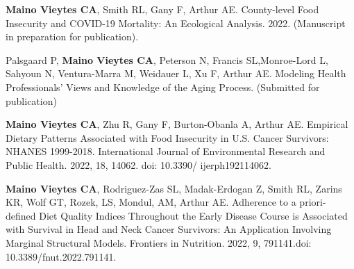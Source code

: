 




\begin{cvskills}

  \cvskill
    {} %
    {\textbf{Maino Vieytes CA}, Smith RL, Gany F, Arthur AE. County-level Food Insecurity and COVID-19 Mortality: An Ecological Analysis. 2022. (Manuscript in preparation for publication).} %


  
   \cvskill
    {} %
    {Palsgaard P, \textbf{Maino Vieytes CA}, Peterson N, Francis SL,Monroe-Lord L, Sahyoun N, Ventura-Marra M, Weidauer L, Xu F, Arthur AE. Modeling Health Professionals' Views and Knowledge of the Aging Process. (Submitted for publication)} %


 \cvskill
    {} %
    {\textbf{Maino Vieytes CA}, Zhu R, Gany F, Burton-Obanla A, Arthur AE. Empirical Dietary Patterns Associated with Food Insecurity in U.S. Cancer Survivors: NHANES 1999-2018. International Journal of Environmental Research and Public Health. 2022, 18, 14062. doi: 10.3390/ ijerph192114062.} %



  \cvskill
    {} %
    {\textbf{Maino Vieytes CA}, Rodriguez-Zas SL, Madak-Erdogan Z, Smith RL, Zarins KR, Wolf GT, Rozek, LS, Mondul, AM, Arthur AE. Adherence to a priori-defined Diet Quality Indices Throughout the Early Disease Course is Associated with Survival in Head and Neck Cancer Survivors: An Application Involving Marginal Structural Models. Frontiers in Nutrition. 2022, 9, 791141.doi: 10.3389/fnut.2022.791141.} %




\end{cvskills}
